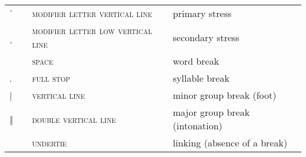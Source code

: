 \label{tab:ipa_boundaries}
 \tablelasttail{\bottomrule}

\begin{center}
\begin{xtabular}{ l L{1.2cm} L{5.6cm} L{4cm} }
{\large ˈ} &  & \textsc{modifier letter vertical line} & primary stress \\
{\large ˌ} &  & \textsc{modifier letter low vertical line} & secondary stress \\
 &  & \textsc{space} & word break \\
{\large.} &  & \textsc{full stop} & syllable break \\
{|} &  & \textsc{vertical line} & minor group break (foot) \\
{‖} &  & \textsc{double vertical line} & major group break (intonation) \\
 &  & \textsc{undertie} & linking (absence of a break) \\
\end{xtabular}
\end{center}
